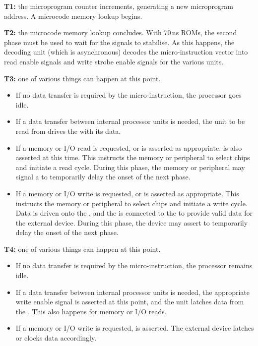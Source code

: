 \begin{description}
\item{\bfseries T1:} the microprogram counter increments, generating a
  new microprogram address. A microcode memory lookup begins.
\item{\bfseries T2:} the microcode memory lookup concludes. With 70\,ns
  ROMs, the second phase must be used to wait for the signals to
  stabilise. As this happens, the decoding unit (which is
  asynchronous) decodes the micro-instruction vector into read enable
  signals and write strobe enable signals for the various units.
\item{\bfseries T3:} one of various things can happen at this point.
  \begin{itemize}
    \item If no data transfer is required by the micro-instruction, the
      processor goes idle.
    \item If a data transfer between internal processor units is
      needed, the unit to be read from drives the \IBUS{} with its data.
    \item If a memory or I/O read is requested,  or  is
      asserted as appropriate.  is also asserted at this
      time. This instructs the memory or peripheral to select chips
      and initiate a read cycle. During this phase, the memory or
      peripheral may signal a  to temporarily delay the onset
      of the next phase.
    \item If a memory or I/O write is requested,  or 
      is asserted as appropriate. This instructs the memory or
      peripheral to select chips and initiate a write cycle. Data is
      driven onto the \IBUS{}, and the \DBUS{} is connected to the
      \IBUS{} to provide valid data for the external device. During
      this phase, the device may assert  to temporarily delay
      the onset of the next phase.
  \end{itemize}
\item{\bfseries T4:} one of various things can happen at this point.
  \begin{itemize}
  \item If no data transfer is required by the micro-instruction, the
    processor remains idle.
  \item If a data transfer between internal processor units is
    needed, the appropriate write enable signal is asserted at this
    point, and the unit latches data from the \IBUS. This also
    happens for memory or I/O reads.
  \item If a memory or I/O write is requested,  is
      asserted. The external device latches or clocks data
      accordingly.
  \end{itemize}
\end{description}

